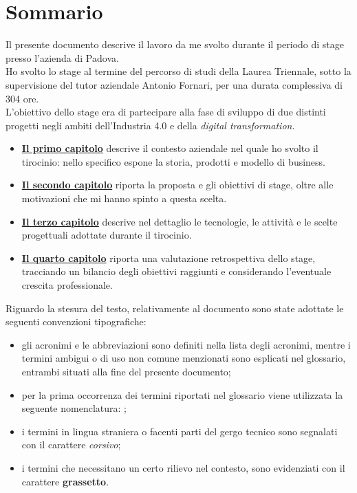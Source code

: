 
\cleardoublepage
{}
{}
\begingroup
\let\clearpage\relax
\let\cleardoublepage\relax
\let\cleardoublepage\relax

\chapter*{Sommario}
Il presente documento descrive il lavoro da me svolto durante il periodo di stage presso l'azienda \AD{} di Padova.\\
Ho svolto lo stage al termine del percorso di studi della Laurea Triennale, sotto la supervisione del tutor aziendale Antonio Fornari, per una durata complessiva di 304 ore.\\
L'obiettivo dello stage era di partecipare alla fase di sviluppo di due distinti progetti negli ambiti dell'Industria 4.0 e della \textit{digital transformation}.
\begin{itemize}
    \item \textbf{{\hyperref[cap:introduzione]{Il primo capitolo}}} descrive il contesto aziendale nel quale ho svolto il tirocinio: nello specifico espone la storia, prodotti e modello di business.
    
    \item \textbf{{\hyperref[cap:obiettivi-stage]{Il secondo capitolo}}} riporta la proposta e gli obiettivi di stage, oltre alle motivazioni che mi hanno spinto a questa scelta.
    
    \item \textbf{{\hyperref[cap:descrizione-stage]{Il terzo capitolo}}} descrive nel dettaglio le tecnologie, le attività e le scelte progettuali adottate durante il tirocinio.
    
    \item \textbf{{\hyperref[cap:analisi-requisiti]{Il quarto capitolo}}} riporta una valutazione retrospettiva dello stage, tracciando un bilancio degli obiettivi raggiunti e considerando l'eventuale crescita professionale.
\end{itemize}
Riguardo la stesura del testo, relativamente al documento sono state adottate le seguenti convenzioni tipografiche:
\begin{itemize}
	\item gli acronimi e le abbreviazioni sono definiti nella lista degli acronimi, mentre i termini ambigui o di uso non comune menzionati sono esplicati nel glossario, entrambi situati alla fine del presente documento;
	\item per la prima occorrenza dei termini riportati nel glossario viene utilizzata la seguente nomenclatura: ;
	\item i termini in lingua straniera o facenti parti del gergo tecnico sono segnalati con il carattere \textit{corsivo};
	\item i termini che necessitano un certo rilievo nel contesto, sono evidenziati con il carattere \textbf{grassetto}.
\end{itemize}
\endgroup			

\vfill

